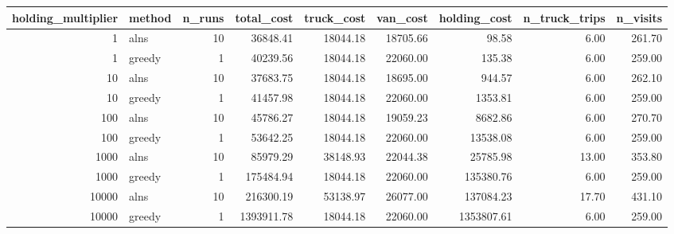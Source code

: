 \begin{tabular}{rlrrrrrrr}
\toprule
holding\_multiplier & method & n\_runs & total\_cost & truck\_cost & van\_cost & holding\_cost & n\_truck\_trips & n\_visits \\
\midrule
1 & alns & 10 & 36848.41 & 18044.18 & 18705.66 & 98.58 & 6.00 & 261.70 \\
1 & greedy & 1 & 40239.56 & 18044.18 & 22060.00 & 135.38 & 6.00 & 259.00 \\
10 & alns & 10 & 37683.75 & 18044.18 & 18695.00 & 944.57 & 6.00 & 262.10 \\
10 & greedy & 1 & 41457.98 & 18044.18 & 22060.00 & 1353.81 & 6.00 & 259.00 \\
100 & alns & 10 & 45786.27 & 18044.18 & 19059.23 & 8682.86 & 6.00 & 270.70 \\
100 & greedy & 1 & 53642.25 & 18044.18 & 22060.00 & 13538.08 & 6.00 & 259.00 \\
1000 & alns & 10 & 85979.29 & 38148.93 & 22044.38 & 25785.98 & 13.00 & 353.80 \\
1000 & greedy & 1 & 175484.94 & 18044.18 & 22060.00 & 135380.76 & 6.00 & 259.00 \\
10000 & alns & 10 & 216300.19 & 53138.97 & 26077.00 & 137084.23 & 17.70 & 431.10 \\
10000 & greedy & 1 & 1393911.78 & 18044.18 & 22060.00 & 1353807.61 & 6.00 & 259.00 \\
\bottomrule
\end{tabular}
